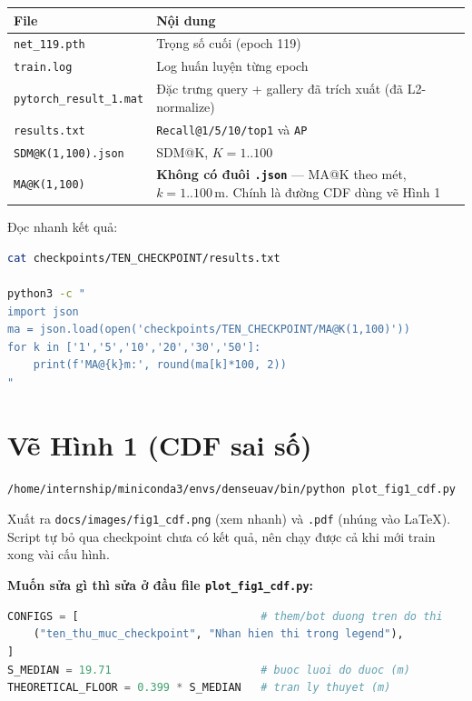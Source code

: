 \documentclass[11pt]{article}
\newcommand{\cmd}[1]{\texttt{\footnotesize #1}}
\begin{document}
\begin{center}
\begin{tabularx}{\textwidth}{lL}
\toprule
\textbf{File} & \textbf{Nội dung} \\
\midrule
\cmd{net\_119.pth} & Trọng số cuối (epoch 119) \\
\cmd{train.log} & Log huấn luyện từng epoch \\
\cmd{pytorch\_result\_1.mat} & Đặc trưng query + gallery đã trích xuất (đã L2-normalize) \\
\cmd{results.txt} & \texttt{Recall@1/5/10/top1} và \texttt{AP} \\
\cmd{SDM@K(1,100).json} & SDM@K, $K = 1..100$ \\
\cmd{MA@K(1,100)} & \textbf{Không có đuôi \texttt{.json}} --- MA@K theo mét, $k = 1..100$\,m. Chính là đường CDF dùng vẽ Hình 1 \\
\bottomrule
\end{tabularx}
\end{center}

Đọc nhanh kết quả:

\begin{lstlisting}[language=bash]
cat checkpoints/TEN_CHECKPOINT/results.txt

python3 -c "
import json
ma = json.load(open('checkpoints/TEN_CHECKPOINT/MA@K(1,100)'))
for k in ['1','5','10','20','30','50']:
    print(f'MA@{k}m:', round(ma[k]*100, 2))
"
\end{lstlisting}

\section{Vẽ Hình 1 (CDF sai số)}

\begin{lstlisting}[language=bash]
/home/internship/miniconda3/envs/denseuav/bin/python plot_fig1_cdf.py
\end{lstlisting}

Xuất ra \texttt{docs/images/fig1\_cdf.png} (xem nhanh) và \texttt{.pdf} (nhúng vào LaTeX). Script tự bỏ qua checkpoint chưa có kết quả, nên chạy được cả khi mới train xong vài cấu hình.

\textbf{Muốn sửa gì thì sửa ở đầu file \texttt{plot\_fig1\_cdf.py}:}

\begin{lstlisting}[language=Python]
CONFIGS = [                            # them/bot duong tren do thi
    ("ten_thu_muc_checkpoint", "Nhan hien thi trong legend"),
]
S_MEDIAN = 19.71                       # buoc luoi do duoc (m)
THEORETICAL_FLOOR = 0.399 * S_MEDIAN   # tran ly thuyet (m)
\end{lstlisting}
\end{document}
